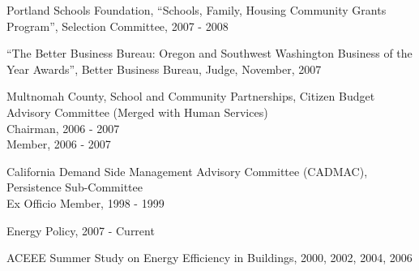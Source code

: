 \documentclass[Computer Science]{vita}
\begin{document}
\begin{vita}
\begin{Professional and Service Activities}
\begin{Community}
    \item Portland Schools Foundation, ``Schools, Family, Housing
      Community Grants Program'', Selection Committee, 2007 - 2008

    \item ``The Better Business Bureau: Oregon and Southwest
      Washington Business of the Year Awards'', Better Business
      Bureau, Judge, November, 2007


    \item Multnomah County, School and Community Partnerships, Citizen Budget Advisory Committee (Merged with Human Services)\\
      Chairman, 2006 - 2007\\
      Member, 2006 - 2007
	
    \item California Demand Side Management Advisory Committee (CADMAC), Persistence Sub-Committee\\
      Ex Officio Member, 1998 - 1999

    \end{Community}
    \begin{Journal Article and Paper Review}

    \item Energy Policy, 2007 - Current
    \item ACEEE Summer Study on Energy Efficiency in Buildings, 2000,
      2002, 2004, 2006
  \end{Journal Article and Paper Review}

  \end{Professional and Service Activities}


% 
% 

\end{vita}
\end{document}
